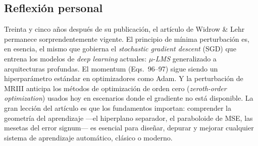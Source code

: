 \documentclass[11pt,a4paper]{article}
\begin{document}
\subsection{Reflexión personal}

Treinta y cinco años después de su publicación, el artículo de Widrow \& Lehr permanece
sorprendentemente vigente. El principio de mínima perturbación es, en esencia, el mismo que
gobierna el \textit{stochastic gradient descent} (SGD) que entrena los modelos de \textit{deep
learning} actuales: $\mu$-\textit{LMS} generalizado a arquitecturas profundas. El momentum
(Eqs.~96--97) sigue siendo un hiperparámetro estándar en optimizadores como Adam. Y la
perturbación de MRIII anticipa los métodos de optimización de orden cero (\textit{zeroth-order
optimization}) usados hoy en escenarios donde el gradiente no está disponible. La gran lección
del artículo es que los fundamentos importan: comprender la geometría del aprendizaje —el
hiperplano separador, el paraboloide de MSE, las mesetas del error signum— es esencial para
diseñar, depurar y mejorar cualquier sistema de aprendizaje automático, clásico o moderno.
\end{document}
